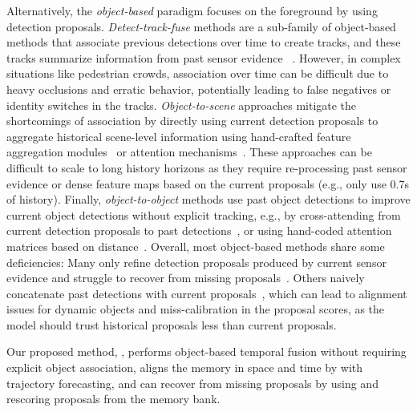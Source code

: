 Alternatively, the \textit{object-based} paradigm focuses on
the foreground by using detection proposals.
\textit{Detect-track-fuse} methods are a sub-family of object-based methods that associate previous detections over time to create tracks,
and these tracks summarize information from past sensor evidence
~\cite{liang2020pnpnet,huang2024ptt,chen2022mppnet,li2023modar,zhang2023motiontrack,li2023modar}.
However, in complex situations like pedestrian crowds, association over time can be difficult due to heavy occlusions and erratic behavior, potentially leading to false negatives or identity switches in the tracks.
\textit{Object-to-scene} approaches mitigate the shortcomings of association by directly using current detection proposals to aggregate historical scene-level information using hand-crafted feature aggregation modules~\cite{he2023msf} or attention mechanisms~\cite{zhou2022centerformer}.
These approaches can be difficult to scale to long history horizons as they require re-processing past sensor evidence or dense feature maps based on the current proposals
(e.g., \cite{zhou2022centerformer,he2023msf} only use 0.7s of history).
Finally, \textit{object-to-object} methods
use past object detections to improve current object detections without explicit tracking,
e.g., by cross-attending from current detection proposals to past detections~\cite{yang20213d,wang2023exploring},
or using hand-coded attention matrices based on distance~\cite{hou2024query}.
Overall, most object-based methods share some deficiencies:
Many only refine detection proposals produced by current sensor evidence and struggle to recover from missing proposals~\cite{he2023msf,yang20213d,hou2024query,chen2022mppnet,huang2024ptt}.
Others naively concatenate past detections with current proposals~\cite{wang2023exploring}, which
can lead to alignment issues for dynamic objects and miss-calibration in the proposal scores, as the model should trust historical proposals less than current proposals.

Our proposed method, \ourmodel{}, performs object-based temporal fusion without requiring explicit object association, aligns the memory in space and time by with trajectory forecasting,
and can recover from missing proposals by using and rescoring proposals from the memory bank.